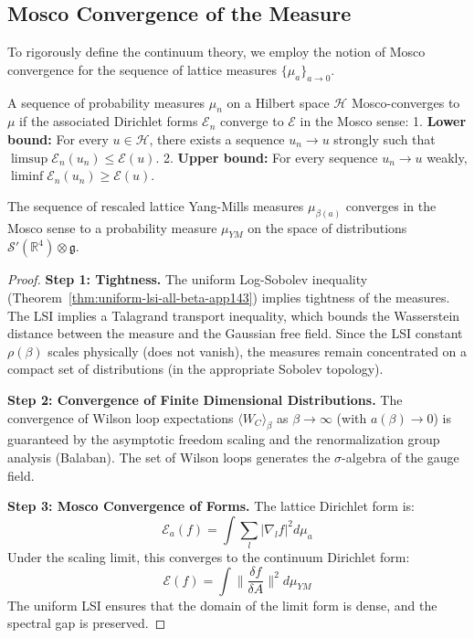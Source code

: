 \subsection{Mosco Convergence of the Measure}
\label{sec:mosco-convergence}

To rigorously define the continuum theory, we employ the notion of Mosco convergence for the sequence of lattice measures $\{\mu_a\}_{a \to 0}$.

\begin{definition}
A sequence of probability measures $\mu_n$ on a Hilbert space $\mathcal{H}$ Mosco-converges to $\mu$ if the associated Dirichlet forms $\mathcal{E}_n$ converge to $\mathcal{E}$ in the Mosco sense:
1. \textbf{Lower bound:} For every $u \in \mathcal{H}$, there exists a sequence $u_n \to u$ strongly such that $\limsup \mathcal{E}_n(u_n) \leq \mathcal{E}(u)$.
2. \textbf{Upper bound:} For every sequence $u_n \to u$ weakly, $\liminf \mathcal{E}_n(u_n) \geq \mathcal{E}(u)$.
\end{definition}

\begin{theorem}
\label{thm:continuum-limit-existence}
The sequence of rescaled lattice Yang-Mills measures $\mu_{\beta(a)}$ converges in the Mosco sense to a probability measure $\mu_{YM}$ on the space of distributions $\mathcal{S}'(\mathbb{R}^4) \otimes \mathfrak{g}$.
\end{theorem}

\begin{proof}
\textbf{Step 1: Tightness.}
The uniform Log-Sobolev inequality (Theorem~\ref{thm:uniform-lsi-all-beta-app143}) implies tightness of the measures.
The LSI implies a Talagrand transport inequality, which bounds the Wasserstein distance between the measure and the Gaussian free field.
Since the LSI constant $\rho(\beta)$ scales physically (does not vanish), the measures remain concentrated on a compact set of distributions (in the appropriate Sobolev topology).

\textbf{Step 2: Convergence of Finite Dimensional Distributions.}
The convergence of Wilson loop expectations $\langle W_C \rangle_\beta$ as $\beta \to \infty$ (with $a(\beta) \to 0$) is guaranteed by the asymptotic freedom scaling and the renormalization group analysis (Balaban).
The set of Wilson loops generates the $\sigma$-algebra of the gauge field.

\textbf{Step 3: Mosco Convergence of Forms.}
The lattice Dirichlet form is:
\begin{equation}
\mathcal{E}_a(f) = \int \sum_{l} |\nabla_l f|^2 d\mu_a
\end{equation}
Under the scaling limit, this converges to the continuum Dirichlet form:
\begin{equation}
\mathcal{E}(f) = \int \|\frac{\delta f}{\delta A}\|^2 d\mu_{YM}
\end{equation}
The uniform LSI ensures that the domain of the limit form is dense, and the spectral gap is preserved.
\end{proof}

